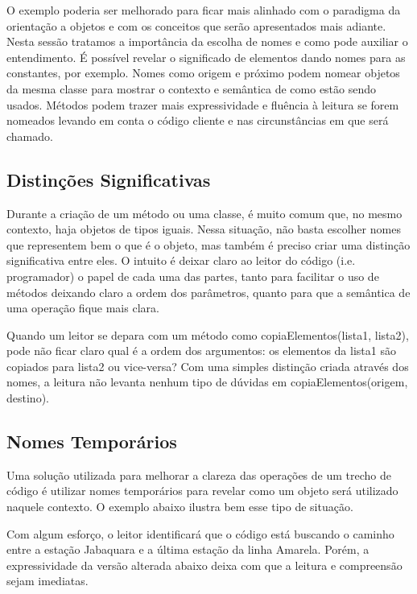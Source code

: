 O exemplo poderia ser melhorado para ficar mais alinhado com o paradigma da orientação a objetos e com os conceitos que serão apresentados mais adiante. Nesta sessão tratamos a importância da escolha de nomes e como pode auxiliar o entendimento. É possível revelar o significado de elementos dando nomes para as constantes, por exemplo. Nomes como origem e próximo podem nomear objetos da mesma classe para mostrar o contexto e semântica de como estão sendo usados. Métodos podem trazer mais expressividade e fluência à leitura se forem nomeados levando em conta o código cliente e nas circunstâncias em que será chamado.

\subsection{Distinções Significativas}
Durante a criação de um método ou uma classe, é muito comum que, no mesmo contexto, haja  objetos de tipos iguais. Nessa situação, não basta escolher nomes que representem bem o que é o objeto, mas também é preciso criar uma distinção significativa entre eles. O intuito é deixar claro ao leitor do código  (i.e. programador) o papel de cada uma das partes, tanto para facilitar o uso de métodos deixando claro a ordem dos parâmetros, quanto para que a semântica de uma operação fique mais clara.
	
Quando um leitor se depara com um método como copiaElementos(lista1, lista2), pode não ficar claro qual é a ordem dos argumentos: os elementos da lista1 são copiados para lista2 ou vice-versa? Com uma simples distinção criada através dos nomes, a leitura não levanta nenhum tipo de dúvidas em copiaElementos(origem, destino).

\subsection{Nomes Temporários}
Uma solução utilizada para melhorar a clareza das operações de um trecho de código é utilizar nomes temporários para revelar como um objeto será utilizado naquele contexto. O exemplo abaixo ilustra bem esse tipo de situação.



Com algum esforço, o leitor identificará que o código está buscando o caminho entre a estação Jabaquara e a última estação da linha Amarela. Porém, a expressividade da versão alterada abaixo deixa com que a leitura e compreensão sejam imediatas.

